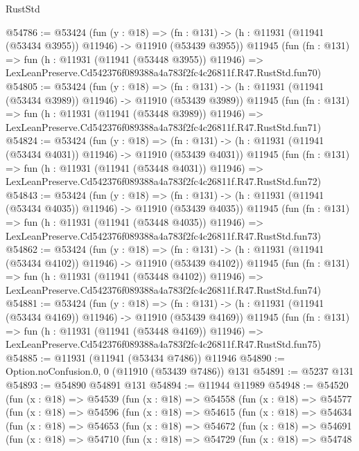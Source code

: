 \begin{lexlean}{RustStd}
\begin{coremodule}
@54786 := @53424
    (fun (y : @18) =>
    (fn : @131) -> (h : @11931 (@11941 (@53434 @3955)) @11946) -> @11910 (@53439 @3955))
    @11945
    (fun (fn : @131) =>
    fun (h : @11931 (@11941 (@53448 @3955)) @11946) =>
    LexLeanPreserve.Cd542376f089388a4a783f2fc4c26811f.R47.RustStd.fun70)
@54805 := @53424
    (fun (y : @18) =>
    (fn : @131) -> (h : @11931 (@11941 (@53434 @3989)) @11946) -> @11910 (@53439 @3989))
    @11945
    (fun (fn : @131) =>
    fun (h : @11931 (@11941 (@53448 @3989)) @11946) =>
    LexLeanPreserve.Cd542376f089388a4a783f2fc4c26811f.R47.RustStd.fun71)
@54824 := @53424
    (fun (y : @18) =>
    (fn : @131) -> (h : @11931 (@11941 (@53434 @4031)) @11946) -> @11910 (@53439 @4031))
    @11945
    (fun (fn : @131) =>
    fun (h : @11931 (@11941 (@53448 @4031)) @11946) =>
    LexLeanPreserve.Cd542376f089388a4a783f2fc4c26811f.R47.RustStd.fun72)
@54843 := @53424
    (fun (y : @18) =>
    (fn : @131) -> (h : @11931 (@11941 (@53434 @4035)) @11946) -> @11910 (@53439 @4035))
    @11945
    (fun (fn : @131) =>
    fun (h : @11931 (@11941 (@53448 @4035)) @11946) =>
    LexLeanPreserve.Cd542376f089388a4a783f2fc4c26811f.R47.RustStd.fun73)
@54862 := @53424
    (fun (y : @18) =>
    (fn : @131) -> (h : @11931 (@11941 (@53434 @4102)) @11946) -> @11910 (@53439 @4102))
    @11945
    (fun (fn : @131) =>
    fun (h : @11931 (@11941 (@53448 @4102)) @11946) =>
    LexLeanPreserve.Cd542376f089388a4a783f2fc4c26811f.R47.RustStd.fun74)
@54881 := @53424
    (fun (y : @18) =>
    (fn : @131) -> (h : @11931 (@11941 (@53434 @4169)) @11946) -> @11910 (@53439 @4169))
    @11945
    (fun (fn : @131) =>
    fun (h : @11931 (@11941 (@53448 @4169)) @11946) =>
    LexLeanPreserve.Cd542376f089388a4a783f2fc4c26811f.R47.RustStd.fun75)
@54885 := @11931 (@11941 (@53434 @7486)) @11946
@54890 := Option.noConfusion.{0, 0} (@11910 (@53439 @7486)) @131
@54891 := @5237 @131
@54893 := @54890 @54891 @131
@54894 := @11944 @11989
@54948 := @54520
    (fun (x : @18) =>
    @54539
      (fun (x : @18) =>
      @54558
        (fun (x : @18) =>
        @54577
          (fun (x : @18) =>
          @54596
            (fun (x : @18) =>
            @54615
              (fun (x : @18) =>
              @54634
                (fun (x : @18) =>
                @54653
                  (fun (x : @18) =>
                  @54672
                    (fun (x : @18) =>
                    @54691
                      (fun (x : @18) =>
                      @54710
                        (fun (x : @18) =>
                        @54729
                          (fun (x : @18) =>
                          @54748

\end{coremodule}
\end{lexlean}
